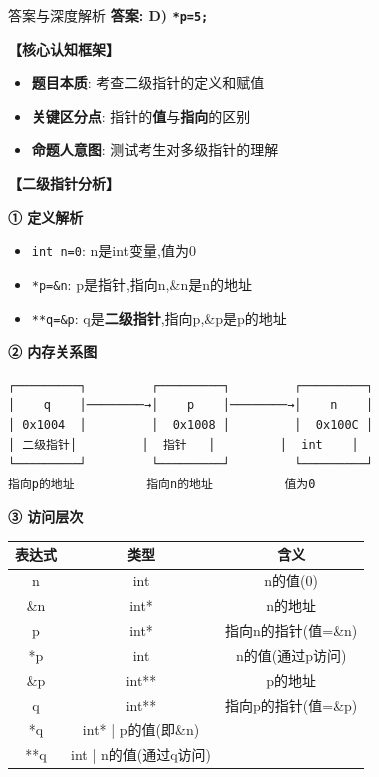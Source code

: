 \documentclass[a4paper,12pt]{article}
\begin{document}
\begin{bluebox}{答案与深度解析}
	\textbf{答案: D) \texttt{*p=5;}}

	\textbf{【核心认知框架】}
	\begin{itemize}[leftmargin=*, nosep]
		\item \textbf{题目本质}: 考查二级指针的定义和赋值
		\item \textbf{关键区分点}: 指针的\textbf{值}与\textbf{指向}的区别
		\item \textbf{命题人意图}: 测试考生对多级指针的理解
	\end{itemize}

	\textbf{【二级指针分析】}

	\textbf{① 定义解析}
	\begin{itemize}[leftmargin=*, nosep]
		\item \texttt{int n=0}: n是int变量,值为0
		\item \texttt{*p=\&n}: p是指针,指向n,\&n是n的地址
		\item \texttt{**q=\&p}: q是\textbf{二级指针},指向p,\&p是p的地址
	\end{itemize}

	\textbf{② 内存关系图}
	\begin{verbatim}
┌─────────┐         ┌─────────┐         ┌─────────┐
│    q    │────────→│    p    │────────→│    n    │
│ 0x1004  │         │  0x1008 │         │  0x100C │
│ 二级指针│         │  指针   │         │  int    │
└─────────┘         └─────────┘         └─────────┘
指向p的地址          指向n的地址          值为0
    \end{verbatim}

	\textbf{③ 访问层次}
	\begin{tabular}{|c|c|c|}
		\hline
		\textbf{表达式} & \textbf{类型}      & \textbf{含义}   \\
		\hline
		n            & int              & n的值(0)        \\
		\hline
		\&n          & int*             & n的地址          \\
		\hline
		p            & int*             & 指向n的指针(值=\&n) \\
		\hline
		*p           & int              & n的值(通过p访问)    \\
		\hline
		\&p          & int**            & p的地址          \\
		\hline
		q            & int**            & 指向p的指针(值=\&p) \\
		\hline
		*q           & int* | p的值(即\&n)                 \\
		\hline
		**q          & int | n的值(通过q访问)                 \\
		\hline
	\end{tabular}


\end{bluebox}
\end{document}
